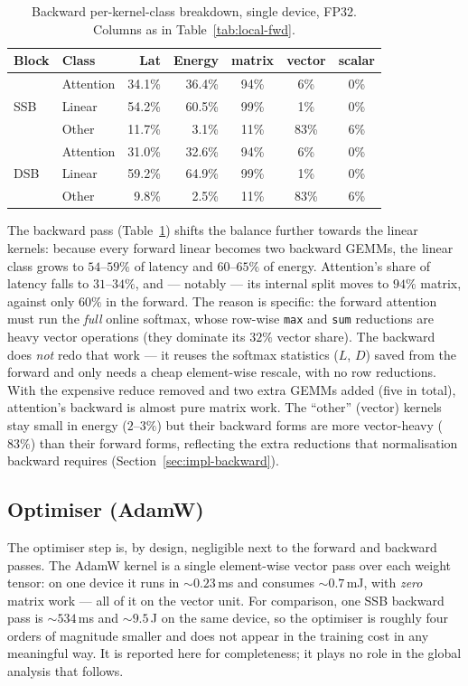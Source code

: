 \documentclass[11pt]{report}
\begin{document}
\begin{table}[h]
\centering
\caption{Backward per-kernel-class breakdown, single device, FP32. Columns
as in Table~\ref{tab:local-fwd}.}
\label{tab:local-bwd}
\begin{tabular}{@{}llrrccc@{}}
\toprule
Block & Class & Lat & Energy & matrix & vector & scalar \\
\midrule
\multirow{3}{*}{SSB} & Attention & 34.1\% & 36.4\% & 94\% & 6\% & 0\% \\
 & Linear & 54.2\% & 60.5\% & 99\% & 1\% & 0\% \\
 & Other & 11.7\% & 3.1\% & 11\% & 83\% & 6\% \\
\midrule
\multirow{3}{*}{DSB} & Attention & 31.0\% & 32.6\% & 94\% & 6\% & 0\% \\
 & Linear & 59.2\% & 64.9\% & 99\% & 1\% & 0\% \\
 & Other & 9.8\% & 2.5\% & 11\% & 83\% & 6\% \\
\bottomrule
\end{tabular}
\end{table}

The backward pass (Table~\ref{tab:local-bwd}) shifts the balance further
towards the linear kernels: because every forward linear becomes two
backward GEMMs, the linear class grows to $54$--$59\%$ of latency and
$60$--$65\%$ of energy. Attention's share of latency falls to $31$--$34\%$,
and --- notably --- its internal split moves to $94\%$ matrix, against only
$60\%$ in the forward. The reason is specific: the forward attention must
run the \emph{full} online softmax, whose row-wise \texttt{max} and
\texttt{sum} reductions are heavy vector operations (they dominate its $32\%$
vector share). The backward does \emph{not} redo that work --- it reuses the
softmax statistics ($L$, $D$) saved from the forward and only needs a cheap
element-wise rescale, with no row reductions. With the expensive reduce
removed and two extra GEMMs added (five in total), attention's backward is
almost pure matrix work. The ``other'' (vector) kernels stay small in
energy ($2$--$3\%$) but their backward forms are more vector-heavy
($83\%$) than their forward forms, reflecting the extra reductions that
normalisation backward requires (Section~\ref{sec:impl-backward}).

\subsection{Optimiser (AdamW)}

The optimiser step is, by design, negligible next to the forward and
backward passes. The AdamW kernel is a single element-wise vector pass over
each weight tensor: on one device it runs in ${\sim}0.23$\,ms and consumes
${\sim}0.7$\,mJ, with \emph{zero} matrix work --- all of it on the vector
unit. For comparison, one SSB backward pass is ${\sim}534$\,ms and
${\sim}9.5$\,J on the same device, so the optimiser is roughly four orders
of magnitude smaller and does not appear in the training cost in any
meaningful way. It is reported here for completeness; it plays no role in
the global analysis that follows.
\end{document}

